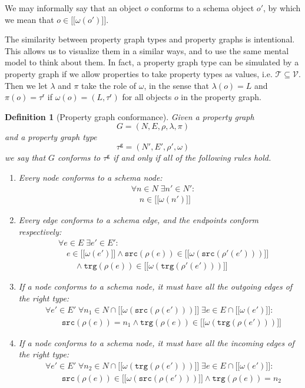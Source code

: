 \documentclass[a4paper]{article}
\newtheorem{definition}[theorem]{Definition}
\newcommand{\src}{\mathtt{src}}
\newcommand{\trg}{\mathtt{trg}}
\newcommand{\ptypes}{\mathcal{T}}
\newcommand{\rtype}{\tau^\mathsf{r}}
\newcommand{\gtype}{\tau^\mathsf{g}}
\newcommand{\lsem}{\ensuremath{[\![}}
\newcommand{\rsem}{\ensuremath{]\!]}}
\newcommand{\sem}[1]{\ensuremath{\lsem #1 \rsem}}
\begin{document}
We may informally say that an object $o$ conforms to a schema object $o'$, by which we mean that $o \in \sem{\omega(o')}$.

The similarity between property graph types and property graphs is intentional. This allows us to visualize them in a similar ways, and to use the same mental model to think about them. In fact, a property graph type can be simulated by a property graph if we allow properties to take property types as values, i.e. $\ptypes \subseteq \mathcal{V}$. Then we let $\lambda$ and $\pi$ take the role of $\omega$, in the sense that $\lambda(o) = L$ and $\pi(o) = \rtype$ if $\omega(o) = (L, \rtype)$ for all objects $o$ in the property graph.

\begin{definition}[Property graph conformance]
  Given a property graph $$G = (N, E, \rho, \lambda, \pi)$$ and a property graph type $$\gtype = (N', E', \rho', \omega)$$ we say that $G$ \emph{conforms} to $\gtype$ if and only if all of the following rules hold.

  \begin{enumerate}
    \item Every node conforms to a schema node:
    \begin{align*}
      &\forall n \in N \; \exists n' \in N' :\\
      &\quad n \in \sem{\omega(n')}
    \end{align*}
    
    \item Every edge conforms to a schema edge, and the endpoints conform respectively:
    \begin{align*}
      &\forall e \in E \; \exists e' \in E' :\\
      &\quad e \in \sem{\omega(e')} \wedge \src(\rho(e)) \in \sem{\omega(\src(\rho'(e')))}\\
      &\quad\quad\wedge \trg(\rho(e)) \in \sem{\omega(\trg(\rho'(e')))}
    \end{align*}
    
    \item If a node conforms to a schema node, it must have all the outgoing edges of the right type:
    \begin{align*}
      &\forall e' \in E' \; \forall n_1 \in N \cap \sem{\omega(\src(\rho(e')))} \; \exists e \in E \cap \sem{\omega(e')} :\\
      &\quad\quad \src(\rho(e)) = n_1 \wedge \trg(\rho(e)) \in \sem{\omega(\trg(\rho(e')))}
    \end{align*}

    \item If a node conforms to a schema node, it must have all the incoming edges of the right type:
    \begin{align*}
      &\forall e' \in E' \; \forall n_2 \in N \cap \sem{\omega(\trg(\rho(e')))} \; \exists e \in E \cap \sem{\omega(e')} :\\
      &\quad\quad \src(\rho(e)) \in \sem{\omega(\src(\rho(e')))} \wedge \trg(\rho(e)) = n_2
    \end{align*}
  \end{enumerate}
\end{definition}
\end{document}
